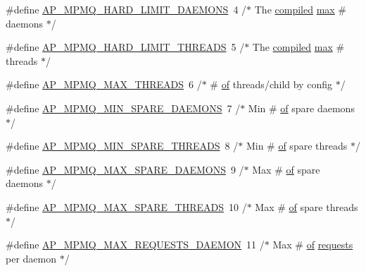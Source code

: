 \begin{DoxyCompactItemize}
\item 
\#define \hyperlink{group__APACHE__CORE__MPM_gad5f8f89d2ba341935e89ceb99ee39ec2}{A\+P\+\_\+\+M\+P\+M\+Q\+\_\+\+H\+A\+R\+D\+\_\+\+L\+I\+M\+I\+T\+\_\+\+D\+A\+E\+M\+O\+NS}~4  /$\ast$ The \hyperlink{pcre_8txt_acf222623ce317d6483b477005378ffb0}{compiled} \hyperlink{group__APR__Util__RC_ga38e7d1fc94ad8c6709d5b2243d2fd94b}{max} \# daemons   $\ast$/
\item 
\#define \hyperlink{group__APACHE__CORE__MPM_ga75ad3f7d2fbb2aae4a57af8c0ebd6e87}{A\+P\+\_\+\+M\+P\+M\+Q\+\_\+\+H\+A\+R\+D\+\_\+\+L\+I\+M\+I\+T\+\_\+\+T\+H\+R\+E\+A\+DS}~5  /$\ast$ The \hyperlink{pcre_8txt_acf222623ce317d6483b477005378ffb0}{compiled} \hyperlink{group__APR__Util__RC_ga38e7d1fc94ad8c6709d5b2243d2fd94b}{max} \# threads   $\ast$/
\item 
\#define \hyperlink{group__APACHE__CORE__MPM_ga870486c242624daffe1d0a325130520f}{A\+P\+\_\+\+M\+P\+M\+Q\+\_\+\+M\+A\+X\+\_\+\+T\+H\+R\+E\+A\+DS}~6  /$\ast$ \# \hyperlink{pcre_8txt_a9d5b55a535a7d176d14b62d664b47b4d}{of} threads/child by config $\ast$/
\item 
\#define \hyperlink{group__APACHE__CORE__MPM_gade254a9bb555d86c181dff19ce5c76e0}{A\+P\+\_\+\+M\+P\+M\+Q\+\_\+\+M\+I\+N\+\_\+\+S\+P\+A\+R\+E\+\_\+\+D\+A\+E\+M\+O\+NS}~7  /$\ast$ Min \# \hyperlink{pcre_8txt_a9d5b55a535a7d176d14b62d664b47b4d}{of} spare daemons       $\ast$/
\item 
\#define \hyperlink{group__APACHE__CORE__MPM_ga61c0fdf3a3d9862dd129d4ea20c66d83}{A\+P\+\_\+\+M\+P\+M\+Q\+\_\+\+M\+I\+N\+\_\+\+S\+P\+A\+R\+E\+\_\+\+T\+H\+R\+E\+A\+DS}~8  /$\ast$ Min \# \hyperlink{pcre_8txt_a9d5b55a535a7d176d14b62d664b47b4d}{of} spare threads       $\ast$/
\item 
\#define \hyperlink{group__APACHE__CORE__MPM_ga429b0e60a2fd0fd383077d2ff3a35cb5}{A\+P\+\_\+\+M\+P\+M\+Q\+\_\+\+M\+A\+X\+\_\+\+S\+P\+A\+R\+E\+\_\+\+D\+A\+E\+M\+O\+NS}~9  /$\ast$ Max \# \hyperlink{pcre_8txt_a9d5b55a535a7d176d14b62d664b47b4d}{of} spare daemons       $\ast$/
\item 
\#define \hyperlink{group__APACHE__CORE__MPM_ga97cae00db227483b1459734664e3f2c6}{A\+P\+\_\+\+M\+P\+M\+Q\+\_\+\+M\+A\+X\+\_\+\+S\+P\+A\+R\+E\+\_\+\+T\+H\+R\+E\+A\+DS}~10  /$\ast$ Max \# \hyperlink{pcre_8txt_a9d5b55a535a7d176d14b62d664b47b4d}{of} spare threads       $\ast$/
\item 
\#define \hyperlink{group__APACHE__CORE__MPM_ga9660ef9cb197f80929951e53ef3c77b2}{A\+P\+\_\+\+M\+P\+M\+Q\+\_\+\+M\+A\+X\+\_\+\+R\+E\+Q\+U\+E\+S\+T\+S\+\_\+\+D\+A\+E\+M\+ON}~11  /$\ast$ Max \# \hyperlink{pcre_8txt_a9d5b55a535a7d176d14b62d664b47b4d}{of} \hyperlink{ab_8c_ab299dd99b9a78c1e18b50f98ce37054b}{requests} per daemon $\ast$/

\end{DoxyCompactItemize}
